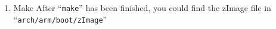 \documentclass[12pt]{article}  %
\begin{document}
\begin{enumerate}
\begin{enumerate}
\begin{enumerate}
\end{enumerate}

\item Make
After ``\texttt{make}'' has been finished, you could find the zImage file in ``\texttt{arch/arm/boot/zImage}''


\end{enumerate}

\end{enumerate}
\end{document}
